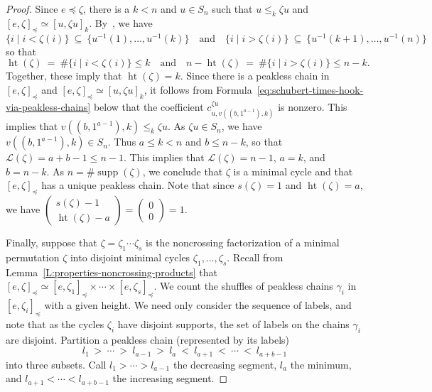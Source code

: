 \documentclass[12pt,oneside,reqno]{amsart}
\theoremstyle{definition}
\numberwithin{equation}{section}
\newcommand{\calL}{{\mathcal L}}
\DeclareMathOperator{\het}{ht}
\DeclareMathOperator{\supp}{supp}
\begin{document}
\begin{proof}
Since $e \preceq \zeta$, there is a $k < n$ and $u \in S_n$ such that $u \leq_k \zeta u$ and $[e, \zeta]_\preceq \simeq [u, \zeta u]_k$.
By~\cite[Thm.~3.1.5]{BS-Bruhat}, we have
\begin{equation*}
    \{i \mid i < \zeta(i)\}\ \subseteq\ \{u^{-1}(1), \ldots, u^{-1}(k)\}
    \quad\text{and}\quad
    \{i \mid i > \zeta(i)\}\ \subseteq\ \{u^{-1}(k + 1), \ldots, u^{-1}(n)\}
\end{equation*}
so that
\begin{equation*}
    \het(\zeta)\ =\ \#\{i \mid i < \zeta(i)\} \leq k
    \quad\text{and}\quad
    n - \het(\zeta)\ =\ \#\{i \mid i > \zeta(i)\} \leq n - k.
\end{equation*}
Together, these imply that $\het(\zeta) = k$.
Since there is a peakless chain in $[e,\zeta]_\preceq$
and $[e,\zeta]_\preceq\simeq[u,\zeta u]_k$,
it follows from Formula~\eqref{eq:schubert-times-hook-via-peakless-chains}
below that the coefficient $c^{\zeta u}_{u, v((b,1^{a-1}),k)}$ is nonzero.
This implies that $v((b,1^{a-1}),k)\leq_k \zeta u$.
As $\zeta u\in S_n$, we have $v((b,1^{a-1}),k)\in S_n$.
Thus $a\leq k<n$ and $b\leq n{-}k$, so that $\calL(\zeta)=a{+}b{-}1\leq n{-}1$.
This implies that $\calL(\zeta)=n{-}1$, $a=k$, and $b=n{-}k$.
As $n=\#\supp(\zeta)$, we conclude that $\zeta$ is a minimal cycle
and that $[e, \zeta]_\preceq$ has a unique peakless chain.
Note that since $s(\zeta) = 1$ and $\het(\zeta) = a$, we have
$\left(\begin{smallmatrix} s(\zeta)-1 \\ \het(\zeta)-a \end{smallmatrix}\right)
= \left(\begin{smallmatrix} 0 \\ 0 \end{smallmatrix}\right) = 1$.

Finally, suppose that $\zeta=\zeta_1\dotsb\zeta_s$ is the noncrossing factorization of a minimal permutation $\zeta$ into disjoint minimal
cycles $\zeta_1,\dotsc,\zeta_s$.
Recall from Lemma~\ref{L:properties-noncrossing-products} that
$[e,\zeta]_\preceq \simeq  [e,\zeta_1]_\preceq \times \dotsb \times  [e,\zeta_s]_\preceq.$
We count the shuffles of peakless chains $\gamma_i$ in $[e,\zeta_i]_\preceq$ with a given height.
We need only consider the sequence of labels, and note that as the cycles $\zeta_i$ have disjoint supports, the set of labels on
the chains $\gamma_i$ are disjoint.
Partition a peakless chain (represented by its labels)
%
\begin{equation}\label{Eq:Peakless_Partition}
    l_1\ >\ \dotsb\ >\ l_{a-1} \ >\  l_a\ <\ l_{a+1}\ <\ \dotsb\ <\ l_{a+b-1}
\end{equation}
%
into three subsets.
Call $l_1> \dotsb>l_{a-1}$ the decreasing segment, $l_a$ the minimum, and
$l_{a+1} <\dotsb<l_{a+b-1}$ the increasing segment.


\end{proof}
\end{document}
